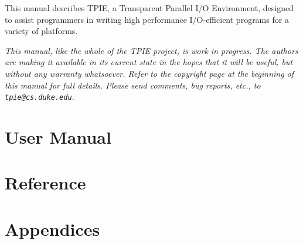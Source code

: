 This manual describes TPIE, a Transparent Parallel I/O
Environment, designed to assist programmers in writing high
performance I/O-efficient programs for a variety of
platforms.

{ \em This manual, like the whole of the TPIE project, is work in
  progress. The authors are making it available in its current state
  in the hopes that it will be useful, but without any warranty
  whatsoever. Refer to the copyright page at the beginning of this
  manual for full details. Please send comments, bug reports, etc., to
  \verb|tpie@cs.duke.edu|.}


\part{User Manual}
  

\part{Reference}
\part{Appendices}
\appendix
  
  
   


\newpage
{}
\printindex



